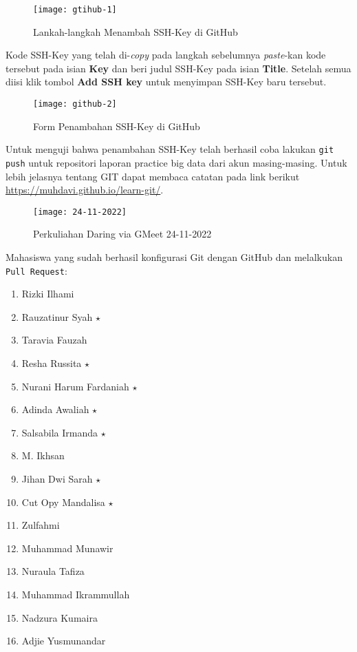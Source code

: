\documentclass[a4paper]{tufte-handout}
\begin{document}
\begin{enumerate}
\begin{figure}[!ht]
\texttt{[image: gtihub-1]}
\caption{Lankah-langkah Menambah SSH-Key di GitHub}
\label{gam:langkah-ssh}
\end{figure}

Kode SSH-Key yang telah di-\textit{copy} pada langkah sebelumnya \textit{paste}-kan kode tersebut pada isian \textbf{Key} dan beri judul SSH-Key pada isian \textbf{Title}. Setelah semua diisi klik tombol \textbf{Add SSH key} untuk menyimpan SSH-Key baru tersebut.

\begin{figure}[!ht]
\texttt{[image: github-2]}
\caption{Form Penambahan SSH-Key di GitHub}
\label{gam:form-ssh}
\end{figure}

Untuk menguji bahwa penambahan SSH-Key telah berhasil coba lakukan {\tt git push} untuk repositori laporan practice big data dari akun masing-masing. Untuk lebih jelasnya tentang GIT dapat membaca catatan pada link berikut \url{https://muhdavi.github.io/learn-git/}.
\end{enumerate}

\begin{figure}[!ht]
\texttt{[image: 24-11-2022]}
\caption{Perkuliahan Daring via GMeet 24-11-2022}
\label{gam:form-ssh}
\end{figure}

\clearpage
{}


Mahasiswa yang sudah berhasil konfigurasi Git dengan GitHub dan melalkukan {\tt Pull Request}:
\begin{multicols}{2}
\begin{enumerate}
\item Rizki Ilhami
\item Rauzatinur Syah $\star$
\item Taravia Fauzah
\item Resha Russita $\star$
\item Nurani Harum Fardaniah $\star$
\item Adinda Awaliah $\star$
\item Salsabila Irmanda $\star$
\item M. Ikhsan
\item Jihan Dwi Sarah $\star$
\item Cut Opy Mandalisa $\star$
\item Zulfahmi
\item Muhammad Munawir
\item Nuraula Tafiza
\item Muhammad Ikrammullah
\item Nadzura Kumaira
\item Adjie Yusmunandar
\end{enumerate}
\end{multicols}
\end{document}
